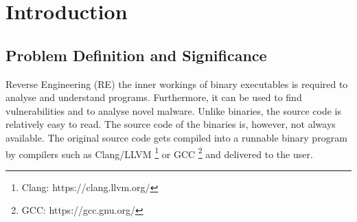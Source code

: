 \chapter{Introduction}
\label{introduction}




\section{Problem Definition and Significance}
Reverse Engineering (RE) the inner workings of binary executables is required to analyse and understand programs. Furthermore, it can be used to find vulnerabilities and to analyse novel malware. Unlike binaries, the source code is relatively easy to read. The source code of the binaries is, however, not always available. The original source code gets compiled into a runnable binary program by compilers such as Clang/LLVM \footnote{Clang: https://clang.llvm.org/} or GCC \footnote{GCC: https://gcc.gnu.org/} and delivered to the user.

